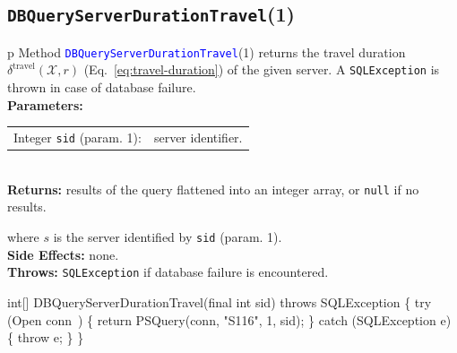 \subsection{\texttt{DBQueryServerDurationTravel}(1)}
\begin{tabular}{p{\textwidth}}
\toprule
{}
Method \textcolor{blue}{{\tt{}\protect{}DBQueryServerDurationTravel}}(1) returns the
travel duration $\delta^\textrm{travel}(\mathcal{X},r)$
(Eq.~\ref{eq:travel-duration}) of the given server.
A {\tt{}SQLException} is thrown in case of database failure.\\
\midrule
\textbf{Parameters:}\\
\begin{tabular}{lp{116mm}}
Integer {\tt{}sid} (param. 1):&server identifier.
\end{tabular}\\
\textbf{Returns:} results of the query flattened into an integer array,
or {\tt{}null} if no results.


where $s$ is the server identified by {\tt{}sid} (param. 1).\\
\textbf{Side Effects:} none.\\
\textbf{Throws:} {\tt{}SQLException} if database failure is encountered.\\
\bottomrule
\end{tabular}
\nwenddocs{}\endmoddef{}
int[] DBQueryServerDurationTravel(final int sid) throws SQLException \{
  try (\LA{}Open \code{}conn\edoc{}~{\nwtagstyle{}}\RA{}) \{
    return PSQuery(conn, "S116", 1, sid);
  \} catch (SQLException e) \{
    throw e;
  \}
\}
\eatline
{}\nwendcode{}\nwdocspar
